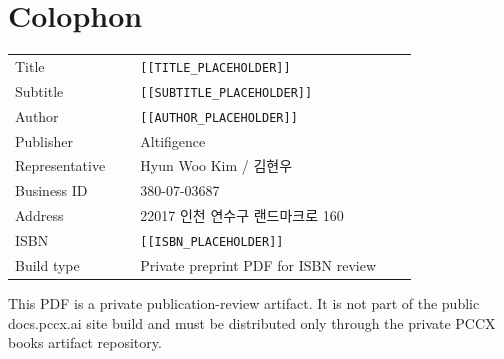 \chapter*{Colophon}
\thispagestyle{plain}

\begin{tabular}{@{}p{0.28\linewidth}p{0.62\linewidth}@{}}
Title & \texttt{[[TITLE\_PLACEHOLDER]]} \\
Subtitle & \texttt{[[SUBTITLE\_PLACEHOLDER]]} \\
Author & \texttt{[[AUTHOR\_PLACEHOLDER]]} \\
Publisher & Altifigence\texttrademark{} \\
Representative & Hyun Woo Kim / 김현우 \\
Business ID & 380-07-03687 \\
Address & 22017 인천 연수구 랜드마크로 160 \\
ISBN & \texttt{[[ISBN\_PLACEHOLDER]]} \\
Build type & Private preprint PDF for ISBN review \\
\end{tabular}

\vspace{1.5cm}

This PDF is a private publication-review artifact. It is not part of the
public docs.pccx.ai site build and must be distributed only through the
private PCCX books artifact repository.
